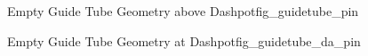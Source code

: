 \begin{geoitem}{Empty Guide Tube Geometry above Dashpot}{fig_guidetube_pin}\centering

\end{geoitem}
\begin{geoitem}{Empty Guide Tube Geometry at Dashpot}{fig_guidetube_da_pin}\centering

\end{geoitem}
